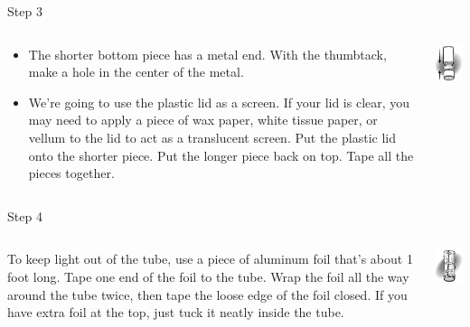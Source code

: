 \begin{frame}{Step 3}
  \begin{columns}
    \begin{column}{0.6\textwidth}
      \begin{itemize}
        \item 
          The shorter bottom piece has a metal end. With the thumbtack, make a hole in the center of the metal.
        \item
          We're going to use the plastic lid as a screen. If your lid is clear, you may need to apply a piece of wax paper, white tissue paper, or vellum to the lid to act as a translucent screen. Put the plastic lid onto the shorter piece. Put the longer piece back on top. Tape all the pieces together.
      \end{itemize}
    \end{column}
    \begin{column}{0.4\textwidth}
      \includegraphics{media/can_cut_off.png}
    \end{column}
  \end{columns}
\end{frame}

\begin{frame}{Step 4}
  \begin{columns}
    \begin{column}{0.6\textwidth}
To keep light out of the tube, use a piece of aluminum foil that's about 1 foot long. Tape one end of the foil to the tube. Wrap the foil all the way around the tube twice, then tape the loose edge of the foil closed. If you have extra foil at the top, just tuck it neatly inside the tube.
    \end{column}
    \begin{column}{0.4\textwidth}
      \includegraphics{media/can_cover.png}
    \end{column}
  \end{columns}
\end{frame}

